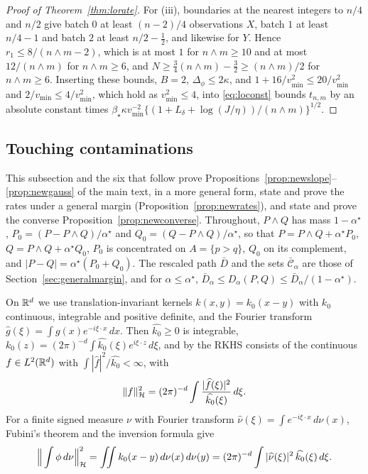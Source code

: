 \begin{proof}[Proof of Theorem~\ref{thm:lorate}]
For (iii), boundaries at the nearest integers to $n/4$ and $n/2$ give batch $0$ at least $(n-2)/4$ observations $X$,
batch $1$ at least $n/4-1$ and batch $2$ at least $n/2-\tfrac12$, and likewise for $Y$. Hence $r_1\le8/(n\wedge m-2)$,
which is at most $1$ for $n\wedge m\ge10$ and at most $12/(n\wedge m)$ for $n\wedge m\ge6$, and
$N\ge\tfrac34(n\wedge m)-\tfrac32\ge(n\wedge m)/2$ for $n\wedge m\ge6$. Inserting these bounds, $B=2$,
$\Delta_\phi\le2\kappa$, and $1+16/v^2_{\min}\le20/v^2_{\min}$ and $2/v_{\min}\le4/v^2_{\min}$, which
hold as $v^2_{\min}\le4$, into \eqref{eq:loconst} bounds $t_{n,m}$ by an absolute constant times
$\beta_\star\kappa v_{\min}^{-2}\{(1+L_\delta+\log(J/\eta))/(n\wedge m)\}^{1/2}$.
\end{proof}

\subsection{Touching contaminations}
\label{sec:newproofs}

This subsection and the six that follow prove Propositions~\ref{prop:newslope}--\ref{prop:newgauss} of the main
text, in a more general form, state and prove the rates under a general margin (Proposition~\ref{prop:newrates}), and
state and prove the converse Proposition~\ref{prop:newconverse}. Throughout, $P\wedge Q$ has mass $1-\alpha^\star$,
$P_0=(P-P\wedge Q)/\alpha^\star$ and $Q_0=(Q-P\wedge Q)/\alpha^\star$, so that $P=P\wedge Q+\alpha^\star P_0$,
$Q=P\wedge Q+\alpha^\star Q_0$, $P_0$ is concentrated on $A=\{p>q\}$, $Q_0$ on its complement, and
$|P-Q|=\alpha^\star(P_0+Q_0)$. The rescaled path $\bar D$ and the sets $\bar{\mathcal C}_\alpha$ are those of
Section~\ref{sec:generalmargin}, and for $\alpha\le\alpha^\star$, $\bar D_{\alpha}\le D_\alpha(P,Q)\le
\bar D_{\alpha}/(1-\alpha^\star)$.

On $\mathbb{R}^d$ we use translation-invariant kernels $k(x,y)=k_0(x-y)$ with $k_0$ continuous, integrable and positive
definite, and the Fourier transform $\widehat g(\xi)=\int g(x)e^{-i\xi\cdot x}\,dx$. Then $\widehat{k_0}\ge0$ is
integrable, $k_0(z)=(2\pi)^{-d}\int\widehat{k_0}(\xi)e^{i\xi\cdot z}\,d\xi$, and by
\citet[Theorem~10.12]{wendland2005scattered} the RKHS consists of the continuous $f\in L^2(\mathbb{R}^d)$ with
$\int|\widehat f|^2/\widehat{k_0}<\infty$, with
\begin{equation}
\|f\|_{\mathcal{H}}^2=(2\pi)^{-d}\int\frac{|\widehat f(\xi)|^2}{\widehat{k_0}(\xi)}\,d\xi .
\label{eq:newnative}
\end{equation}
For a finite signed measure $\nu$ with Fourier transform $\widehat\nu(\xi)=\int e^{-i\xi\cdot x}\,d\nu(x)$, Fubini's
theorem and the inversion formula give
\begin{equation}
\Big\|\int\phi\,d\nu\Big\|_{\mathcal{H}}^2=\iint k_0(x-y)\,d\nu(x)\,d\nu(y)=(2\pi)^{-d}\int|\widehat\nu(\xi)|^2\,\widehat{k_0}(\xi)\,d\xi .
\label{eq:newbochner}
\end{equation}

